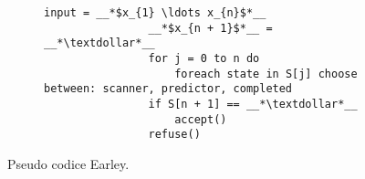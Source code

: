 \documentclass{subfiles}
\begin{document}
\begin{figure}[h!]
    \centering
    \begin{subfigure}[b]{0.55\textwidth}
        \begin{lstlisting}[language = PSEUDO]
                input = __*$x_{1} \ldots x_{n}$*__
                __*$x_{n + 1}$*__ = __*\textdollar*__
                for j = 0 to n do
                    foreach state in S[j] choose between: scanner, predictor, completed
                if S[n + 1] == __*\textdollar*__
                    accept()
                refuse()
            \end{lstlisting}
    \end{subfigure}
    \caption{Pseudo codice Earley.}
    \label{fig:2}
\end{figure}
\end{document}
